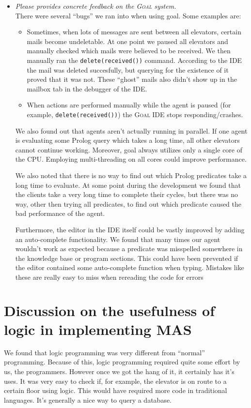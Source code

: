 \documentclass[a4paper,11pt,twocolumn]{article}
\begin{document}
\begin{itemize}
 \item \emph{Please provides concrete feedback on the \textsc{Goal} system.}\\
 There were several ``bugs'' we ran into when using goal. Some examples are:
 \begin{itemize}
  \item Sometimes, when lots of messages are sent between all elevators, certain mails become undeletable. At one point we paused all elevators and manually checked which mails were believed to be received. We then manually ran the \texttt{delete(received())} command. According to the IDE the mail was deleted succesfully, but querying for the existence of it proved that it was not. These ``ghost'' mails also didn't show up in the mailbox tab in the debugger of the IDE.
  
  \item When actions are performed manually while the agent is paused (for example, \texttt{delete(received())}) the \textsc{Goal} IDE stops responding/crashes.
 \end{itemize}
 
 We also found out that agents aren't actually running in parallel. If one agent is evaluating some Prolog query which takes a long time, all other elevators cannot continue working. Moreover, goal always utilizes only a single core of the CPU. Employing multi-threading on all cores could improve performance.
 
 We also noted that there is no way to find out which Prolog predicates take a long time to evaluate. At some point during the development we found that the clients take a very long time to complete their cycles, but there was no way, other then trying all predicates, to find out which predicate caused the bad performance of the agent. 
 
 Furthermore, the editor in the IDE itself could be vastly improved by adding an auto-complete functionality. We found that many times our agent wouldn't work as expected because a predicate was misspelled somewhere in the knowledge base or program sections. This could have been prevented if the editor contained some auto-complete function when typing. Mistakes like these are really easy to miss when rereading the code for errors 
\end{itemize}


\section{Discussion on the usefulness of logic in implementing MAS}
We found that logic programming was very different from ``normal'' programming. Because of this, logic programming required quite some effort by us, the programmers. However once we got the hang of it, it certainly has it's uses. It was very easy to check if, for example, the elevator is on route to a certain floor using logic. This would have required more code in traditional languages. It's generally a nice way to query a database.
\end{document}
